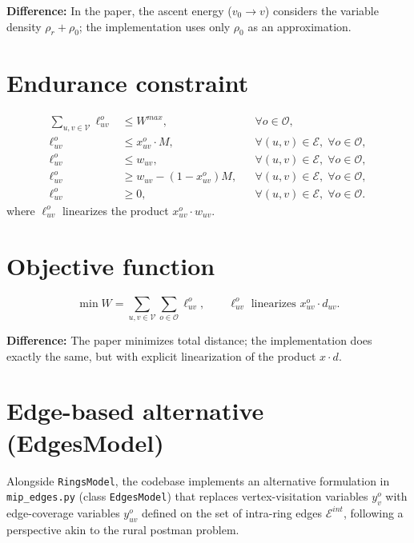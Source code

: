 \documentclass[12pt]{article}
\begin{document}
\noindent \textbf{Difference:} In the paper, the ascent energy ($v_0\to v$)
considers the variable density $\rho_r + \rho_0$; the implementation uses only
$\rho_0$ as an approximation.

\section{Endurance constraint}

\begin{align}
  \sum_{u,v\in\mathcal V} \ell_{uv}^o &\le W^{max},
        && \forall o\in\mathcal O, \tag{END}\\
  \ell_{uv}^o &\le x_{uv}^o \cdot M,
        && \forall (u,v)\in\mathcal E,\; \forall o\in\mathcal O, \tag{END-LIN1}\\
  \ell_{uv}^o &\le w_{uv},
        && \forall (u,v)\in\mathcal E,\; \forall o\in\mathcal O, \tag{END-LIN2}\\
  \ell_{uv}^o &\ge w_{uv} - (1-x_{uv}^o) M,
        && \forall (u,v)\in\mathcal E,\; \forall o\in\mathcal O, \tag{END-LIN3}\\
  \ell_{uv}^o &\ge 0,
        && \forall (u,v)\in\mathcal E,\; \forall o\in\mathcal O. \tag{END-LIN4}
\end{align}
where $\ell_{uv}^o$ linearizes the product $x_{uv}^o \cdot w_{uv}$.

\section{Objective function}

\begin{equation}
  \min W = \sum_{u,v\in\mathcal V}\sum_{o\in\mathcal O}
  \ell_{uv}^o, \qquad \ell_{uv}^o \text{ linearizes } x_{uv}^o \cdot d_{uv}. \tag{OBI}
\end{equation}

\noindent \textbf{Difference:} The paper minimizes total distance;
the implementation does exactly the same, but with explicit
linearization of the product $x\cdot d$.

\section{Edge-based alternative (EdgesModel)}\label{sec:edge-model}

Alongside \texttt{RingsModel}, the codebase implements an alternative formulation
in \texttt{mip\_edges.py} (class \texttt{EdgesModel}) that replaces vertex-visitation
variables $y_v^o$ with edge-coverage variables $y_{uv}^o$ defined on the set of
intra-ring edges $\mathcal E^{int}$, following a perspective akin to the rural
postman problem.
\end{document}

